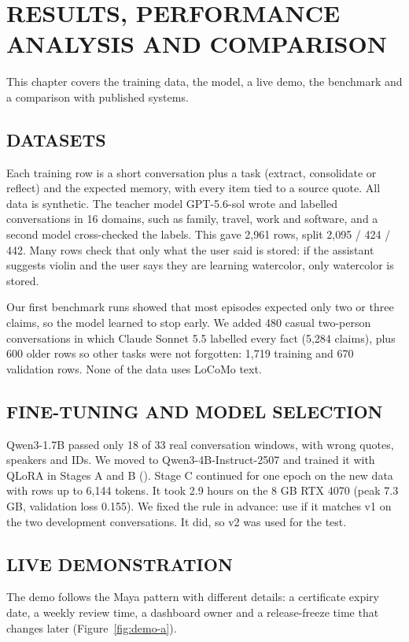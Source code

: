
\chapter{\uppercase{Results, Performance Analysis and Comparison}}
\label{ch:results}
This chapter covers the training data, the model, a live demo, the benchmark and a comparison
with published systems.

\section{\uppercase{Datasets}}
Each training row is a short conversation plus a task (extract, consolidate or reflect) and the
expected memory, with every item tied to a source quote. All data is synthetic. The teacher
model GPT-5.6-sol wrote and labelled conversations in 16 domains, such as family, travel, work
and software, and a second model cross-checked the labels. This gave 2,961 rows, split
2,095 / 424 / 442. Many rows check that only what the user said is stored: if the assistant
suggests violin and the user says they are learning watercolor, only watercolor is stored.

Our first benchmark runs showed that most episodes expected only two or three claims, so the
model learned to stop early. We added 480 casual two-person conversations in which Claude
Sonnet 5.5 labelled every fact (5,284 claims), plus 600 older rows so other tasks were not
forgotten: 1,719 training and 670 validation rows. None of the data uses LoCoMo text.

\section{\uppercase{Fine-Tuning and Model Selection}}
Qwen3-1.7B passed only 18 of 33 real conversation windows, with wrong quotes, speakers and
IDs. We moved to Qwen3-4B-Instruct-2507 and trained it with QLoRA in Stages A and B
(). Stage C continued for one epoch on the new data with rows up to 6,144
tokens. It took 2.9 hours on the 8 GB RTX 4070 (peak 7.3 GB, validation loss 0.155). We fixed
the rule in advance: use  if it matches v1 on the two development
conversations. It did, so v2 was used for the test.

\section{\uppercase{Live Demonstration}}
The demo follows the Maya pattern with different details: a certificate expiry date, a weekly
review time, a dashboard owner and a release-freeze time that changes later
(Figure~\ref{fig:demo-a}).

